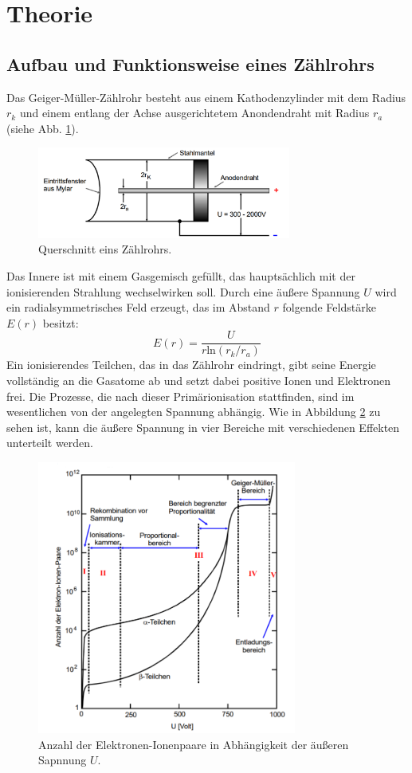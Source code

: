 \section{Theorie}
\label{sec:Theorie}

\subsection{Aufbau und Funktionsweise eines Zählrohrs}

Das Geiger-Müller-Zählrohr besteht aus einem Kathodenzylinder mit dem Radius $r_k$ und einem entlang der Achse ausgerichtetem Anondendraht mit Radius $r_a$ (siehe Abb. \ref{fig:Rohr}).
\begin{figure}
  \centering
  \includegraphics[height=3cm]{data/Rohr.png}
  \caption{Querschnitt eins Zählrohrs. \cite{V703}}
  \label{fig:Rohr}
\end{figure}
Das Innere ist mit einem Gasgemisch gefüllt, das hauptsächlich mit der ionisierenden Strahlung wechselwirken soll.
Durch eine äußere Spannung $U$ wird ein radialsymmetrisches Feld erzeugt, das im Abstand $r$ folgende Feldstärke $E(r)$ besitzt:
\begin{equation}
  E(r) = \frac{U}{r \text{ln}(r_k/r_a)}
  \label{eqn:gl1s}
\end{equation}
Ein ionisierendes Teilchen, das in das Zählrohr eindringt, gibt seine Energie vollständig an die Gasatome ab und setzt dabei positive Ionen und Elektronen frei.
Die Prozesse, die nach dieser Primärionisation stattfinden, sind im wesentlichen von der angelegten Spannung abhängig.
Wie in Abbildung \ref{fig:Bereiche} zu sehen ist, kann die äußere Spannung in vier Bereiche mit verschiedenen Effekten unterteilt werden.
\begin{figure}
  \centering
  \includegraphics[height=9cm]{data/Bereiche.png}
  \caption{Anzahl der Elektronen-Ionenpaare in Abhängigkeit der äußeren Sapnnung $U$. \cite{V703}}
  \label{fig:Bereiche}
\end{figure}
